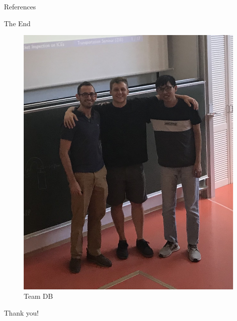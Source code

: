 \documentclass[handout]{beamer}
\begin{document}
\begin{frame}{References}
    {}
    
\end{frame}

\begin{frame}{The End}
    \begin{figure}
        \centering
        \includegraphics[scale=0.1]{team_DB_cropped.jpg}
        \caption*{Team DB}
        \label{fig:my_label}
    \end{figure}
    \centering
    \alert{Thank you!}
    
\end{frame}
\end{document}
